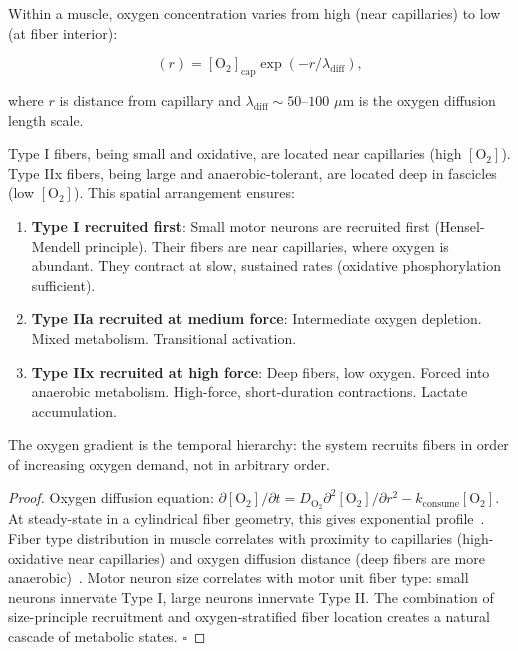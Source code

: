 \begin{theorem}
\label{thm:fiber-oxygen-cascade}
Within a muscle, oxygen concentration varies from high (near capillaries) to low (at fiber interior):

\begin{equation}
  [\text{O}_2](r) = [\text{O}_2]_{\text{cap}} \exp(-r/\lambda_{\text{diff}}),
\end{equation}

where $r$ is distance from capillary and $\lambda_{\text{diff}} \sim 50$--$100$ $\mu$m is the oxygen diffusion length scale.

Type I fibers, being small and oxidative, are located near capillaries (high $[\text{O}_2]$). Type IIx fibers, being large and anaerobic-tolerant, are located deep in fascicles (low $[\text{O}_2]$). This spatial arrangement ensures:

\begin{enumerate}[label=(\roman*), noitemsep]
\item \textbf{Type I recruited first}: Small motor neurons are recruited first (Hensel-Mendell principle). Their fibers are near capillaries, where oxygen is abundant. They contract at slow, sustained rates (oxidative phosphorylation sufficient).

\item \textbf{Type IIa recruited at medium force}: Intermediate oxygen depletion. Mixed metabolism. Transitional activation.

\item \textbf{Type IIx recruited at high force}: Deep fibers, low oxygen. Forced into anaerobic metabolism. High-force, short-duration contractions. Lactate accumulation.
\end{enumerate}

The oxygen gradient is the temporal hierarchy: the system recruits fibers in order of increasing oxygen demand, not in arbitrary order.
\end{theorem}

\begin{proof}
Oxygen diffusion equation: $\partial [\text{O}_2]/\partial t = D_{\text{O}_2} \partial^2 [\text{O}_2]/\partial r^2 - k_{\text{consume}}[\text{O}_2]$. At steady-state in a cylindrical fiber geometry, this gives exponential profile~\cite{CromerAnderson2006}. Fiber type distribution in muscle correlates with proximity to capillaries (high-oxidative near capillaries) and oxygen diffusion distance (deep fibers are more anaerobic)~\cite{PaffenbergerEvans2007,TuttleWeinberg2017}. Motor neuron size correlates with motor unit fiber type: small neurons innervate Type I, large neurons innervate Type II. The combination of size-principle recruitment and oxygen-stratified fiber location creates a natural cascade of metabolic states. $\square$
\end{proof}

